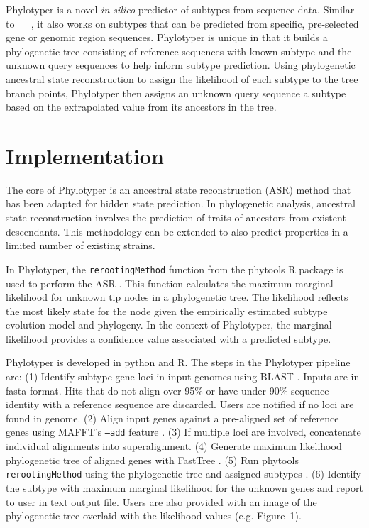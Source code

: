 \documentclass{bioinfo}
\providecommand{\DIFadd}[1]{{\protect\color{red}#1}} %
\providecommand{\DIFaddbegin}{} %
\providecommand{\DIFaddend}{} %
\begin{document}
Phylotyper is a novel \textit{in silico} predictor of subtypes from sequence data.
\DIFaddbegin \DIFadd{Similar to \mbox{%
\citep{Joensen2015,Ingle2016,CARRILLO2016}
}%
, it also works on subtypes that can be predicted from specific, pre-selected gene or genomic region sequences.
}\DIFaddend Phylotyper is unique in that it builds a phylogenetic tree consisting of reference sequences with known subtype and the unknown query sequences to help inform subtype prediction.
Using phylogenetic ancestral state reconstruction to assign the likelihood of each subtype to the tree branch points, Phylotyper \DIFaddbegin \DIFadd{then }\DIFaddend assigns an unknown query sequence a subtype based on the extrapolated value from its ancestors in the tree.

\section{Implementation}

The core of Phylotyper is an ancestral state reconstruction (ASR) method that has been adapted for hidden state prediction.
In phylogenetic analysis, ancestral state reconstruction involves the prediction of traits of ancestors from existent descendants.
This methodology can be extended to also predict properties in a limited number of existing strains.

In Phylotyper, the \texttt{rerootingMethod} function from the phytools R package is used to perform the ASR \citep{Revell2011}.
This function calculates the maximum marginal likelihood for unknown tip nodes in a phylogenetic tree.
The likelihood reflects the most likely state for the node given the empirically estimated subtype evolution model and phylogeny.
In the context of Phylotyper, the marginal likelihood provides a confidence value associated with a predicted subtype.

Phylotyper is developed in python and R. 
The steps in the Phylotyper pipeline are: 
(1) Identify subtype gene loci in input genomes using BLAST \citep{Camacho2009}. \DIFaddbegin \DIFadd{Inputs are in fasta format. Hits that do not align over 95}\% \DIFadd{or have under 90}\% \DIFadd{sequence identity with a reference sequence are discarded. Users are notified if no loci are found in genome.
}\DIFaddend (2) Align input genes against a pre-aligned set of reference genes using MAFFT's \texttt{--add} feature \citep{Katoh2013}.
(3) If multiple loci are involved, concatenate individual alignments into superalignment.
(4) Generate maximum likelihood phylogenetic tree of aligned genes with FastTree \citep{Price2010}.
(5) Run phytools \texttt{rerootingMethod} using the phylogenetic tree and assigned subtypes \citep{Revell2011}.
(6) Identify the subtype with maximum marginal likelihood for the unknown genes and report to user in text output file.
Users are also provided with an image of the phylogenetic tree overlaid with the likelihood values (e.g. Figure~1\vphantom{\ref{fig:01}}).
\end{document}
